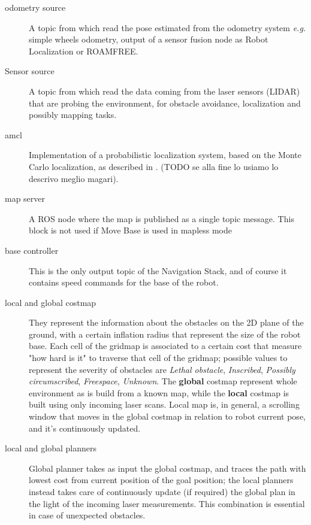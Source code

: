 \begin{description}
	\item[odometry source] A topic from which read the pose estimated from the odometry system \textit{e.g.} simple wheels odometry, output of a sensor fusion node as Robot Localization or ROAMFREE.
	\item[Sensor source] A topic from which read the data coming from the laser sensors (\ac{LIDAR}) that are probing the environment, for obstacle avoidance, localization and possibly mapping tasks.
	\item[amcl] Implementation of a probabilistic localization system, based on the Monte Carlo localization, as described in \cite{monteCarloLocalization}. (TODO se alla fine lo usiamo lo descrivo meglio magari).
	\item[map server] A \ac{ROS} node where the map is published as a single topic message. This block is not used if Move Base is used in mapless mode 
	\item[base controller] This is the only output topic of the Navigation Stack, and of course it contains speed commands for the base of the robot.
	\item[local and global costmap] They represent the information about the obstacles on the 2D plane of the ground, with a certain inflation radius that represent the size of the robot base. Each cell of the gridmap is associated to a certain cost that measure "how hard is it" to traverse that cell of the gridmap; possible values to represent the severity of obstacles are \textit{Lethal obstacle}, \textit{Inscribed}, \textit{Possibly circumscribed}, \textit{Freespace}, \textit{Unknown}. The \textbf{global} costmap represent whole environment as is build from a known map, while the \textbf{local} costmap is built using only incoming laser scans. Local map is, in general, a scrolling window that moves in the global costmap in relation to robot current pose, and it's continuously updated.
	\item[local and global planners] Global planner takes as input the global costmap, and traces the path with lowest cost from current position of the goal position; the local planners instead takes care of continuously update (if required) the global plan in the light of the incoming laser measurements. This combination is essential in case of unexpected obstacles.
\end{description}





